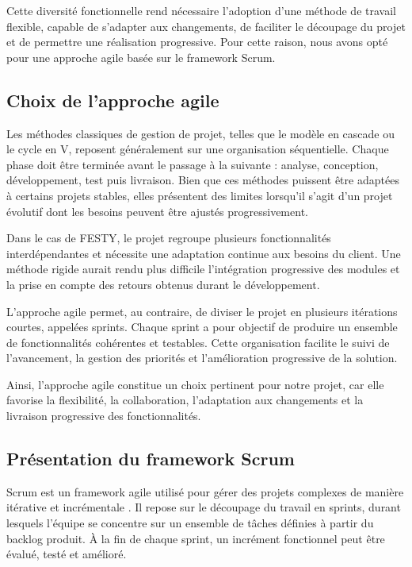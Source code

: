 Cette diversité fonctionnelle rend nécessaire l'adoption d'une méthode de travail flexible, capable de s'adapter aux changements, de faciliter le découpage du projet et de permettre une réalisation progressive. Pour cette raison, nous avons opté pour une approche agile basée sur le framework Scrum.

\subsection{Choix de l’approche agile}
Les méthodes classiques de gestion de projet, telles que le modèle en cascade ou le cycle en V, reposent généralement sur une organisation séquentielle. Chaque phase doit être terminée avant le passage à la suivante : analyse, conception, développement, test puis livraison. Bien que ces méthodes puissent être adaptées à certains projets stables, elles présentent des limites lorsqu'il s'agit d'un projet évolutif dont les besoins peuvent être ajustés progressivement.

Dans le cas de FESTY, le projet regroupe plusieurs fonctionnalités interdépendantes et nécessite une adaptation continue aux besoins du client. Une méthode rigide aurait rendu plus difficile l'intégration progressive des modules et la prise en compte des retours obtenus durant le développement.

L'approche agile permet, au contraire, de diviser le projet en plusieurs itérations courtes, appelées sprints. Chaque sprint a pour objectif de produire un ensemble de fonctionnalités cohérentes et testables. Cette organisation facilite le suivi de l'avancement, la gestion des priorités et l'amélioration progressive de la solution.

Ainsi, l'approche agile constitue un choix pertinent pour notre projet, car elle favorise la flexibilité, la collaboration, l'adaptation aux changements et la livraison progressive des fonctionnalités.

\subsection{Présentation du framework Scrum}
Scrum est un framework agile utilisé pour gérer des projets complexes de manière itérative et incrémentale \cite{REF-SCRUM}. Il repose sur le découpage du travail en sprints, durant lesquels l'équipe se concentre sur un ensemble de tâches définies à partir du backlog produit. À la fin de chaque sprint, un incrément fonctionnel peut être évalué, testé et amélioré.

